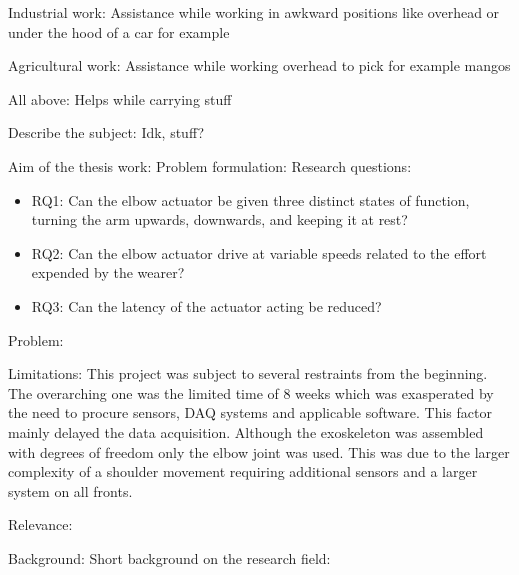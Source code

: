             Industrial work:
                Assistance while working in awkward positions like overhead or under the hood of a car for example

            Agricultural work:
                Assistance while working overhead to pick for example mangos
            
            All above:
                Helps while carrying stuff

    Describe the subject: %
        Idk, stuff?

    Aim of the thesis work: %
        Problem formulation: %
            Research questions:
            \begin{itemize}
                 
                \item RQ1: Can the elbow actuator be given three distinct states of function, turning the arm upwards, downwards, and keeping it at rest?

                \item RQ2: Can the elbow actuator drive at variable speeds related to the effort expended by the wearer?

                \item RQ3: Can the latency of the actuator acting be reduced?

            \end{itemize}

            Problem:
                

            Limitations:
                This project was subject to several restraints from the beginning. The overarching one was the limited time of 8 weeks which was
                exasperated by the need to procure sensors, DAQ systems and applicable software. This factor mainly delayed the data acquisition. 
                Although the exoskeleton was assembled with degrees of freedom only the elbow joint was used. This was due to the larger complexity 
                of a shoulder movement requiring additional sensors and a larger system on all fronts.
            
            Relevance: %


Background: 
    Short background on the research field:


